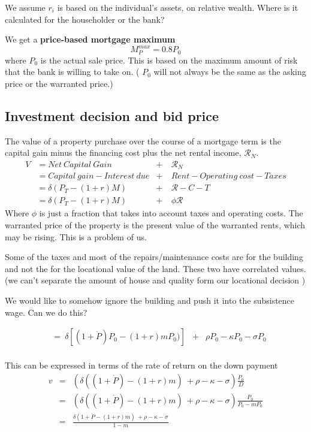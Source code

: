 We assume $r_i$ is based on the individual's assets, on relative wealth. Where is it calculated for the householder or the bank?

We get a \textbf{price-based mortgage maximum} \[M^{max}_P = 0.8P_0\] where $P_0$ is the actual sale price. This is based on the maximum amount of risk that the bank is willing to take on. ( $P_0$  will not always be the same as the asking price or the warranted price.) 


\subsection{Investment decision and bid price}
The value of a property purchase over the course of a mortgage term is the capital gain minus the financing cost plus the net rental income, $\mathcal{R}_N$. 
\begin{align}
V  	&= Net\ Capital\ Gain & +\ & \mathcal{R}_N\\
    &=  Capital\ gain - Interest\ due      &+\ &   Rent  - Operating\ cost - Taxes  \nonumber \\
    &= \delta(P_T- (1+r)M)             	& +\ & \mathcal{R} -C - T \\
    &= \delta(P_T- (1+r)M)             	& +\ & \phi\mathcal{R}
    \end{align}
Where $\phi$ is just a fraction that takes into account taxes and operating costs.  The warranted price of the property is the present value of the warranted rents, which may be rising. This is a problem of us.

Some of the taxes and most of the repairs/maintenance costs are for the building and not the for the locational value of the land. These two have correlated values. (we can't separate the amount of house and quality form our locational decision ) 

We would like to  somehow ignore the building and push it into the subsistence wage. Can we do this?





\begin{align}  
    &= \ \delta \left[(1+\dot P)  P_0- (1+r)mP_0)\right]  & + & \rho P_0  - \kappa P_0 - \sigma P_0  \nonumber \\
\end{align}

This can be expressed in terms of the rate of return on the down payment
\begin{eqnarray}
v &=&( \delta((1+\dot P)  - (1+r)m) \    + \rho  - \kappa - \sigma) \frac{P_0}{D}   \nonumber \\
  &=& (\delta((1+\dot P)  - (1+r)m) \    + \rho  - \kappa - \sigma) \frac{P_0}{P_0-mP_0}   \nonumber \\
  &=&\frac{ \delta(1+\dot P  - (1+r)m) \ + \rho  - \kappa - \sigma} {1-m} \label{Eqn:DecisionRule}
\end{eqnarray}


